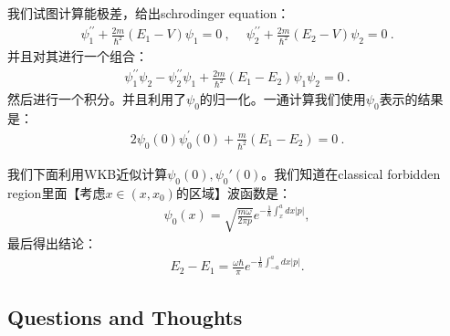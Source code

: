 \bigskip
{}

我们试图计算能极差，给出schrodinger equation：
\begin{align}
  \psi_1^{\prime\prime}+\frac{2m}{\hbar^2}(E_1-V)\psi_1=0\mathrm{~,~}\quad\psi_2^{\prime\prime}+\frac{2m}{\hbar^2}(E_2-V)\psi_2=0\mathrm{~.}
\end{align}
并且对其进行一个组合：
\begin{align}
  \psi_{1}^{\prime\prime}\psi_{2}-
  \psi_{2}^{\prime\prime}\psi_{1}+\frac{2m}{\hbar^{2}}(E_{1}-E_{2})\psi_{1}\psi_{2}=0\mathrm{~.}
\end{align}
然后进行一个积分。并且利用了$ \psi_0 $的归一化。一通计算我们使用$ \psi_0 $表示的结果是：
\begin{align}
  2{\psi}_{0}(0){\psi}_{0}^{\prime}(0)+\frac{{m}}{{\hbar}^{2}}(E_{1}{-}E_{2})=0\mathrm{~.}
\end{align}

\bigskip
{}

我们下面利用WKB近似计算$ \psi_0(0),\psi_0'(0) $。我们知道在classical forbidden
region里面【考虑$ x \in (x, x_0) $的区域】波函数是：
\begin{align}
  \psi_{0}(x)=\sqrt{\frac{m{\omega}}{2\pi
  p}}e^{-\frac{1}{\hbar}\int_{x}^{a}dx|p|},
\end{align}
最后得出结论：
\begin{align}
  E_{2}{-}E_{1}=\frac{{\omega\hbar}}{{\pi}}e^{-\frac{1}{\hbar}\int_{-a}^{a}dx|p|}.
\end{align}

\subsection{Questions and Thoughts}
